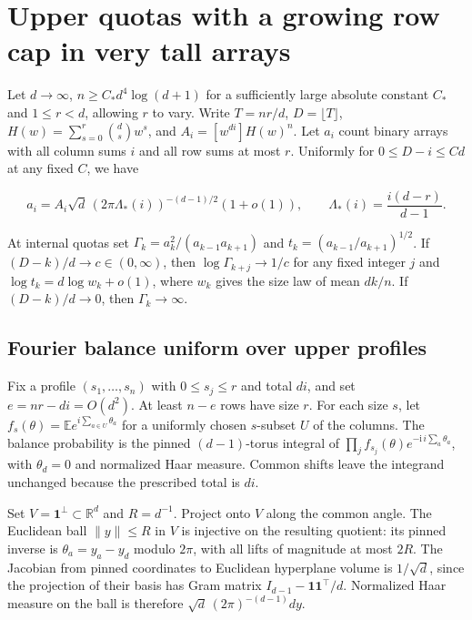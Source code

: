 \section{Upper quotas with a growing row cap in very tall arrays}\label{sec:upper-quota}

Let $d\to\infty$, $n\ge C_*d^4\log(d+1)$ for a sufficiently large absolute constant $C_*$ and $1\le r<d$, allowing $r$ to vary. Write $T=nr/d$, $D=\lfloor T\rfloor$, $H(w)=\sum_{s=0}^r\binom ds w^s$, and $A_i=[w^{di}]H(w)^n$. Let $a_i$ count binary arrays with all column sums $i$ and all row sums at most $r$. Uniformly for $0\le D-i\le Cd$ at any fixed $C$, we have

\begin{equation*}
a_i=A_i\sqrt d\,(2\pi\Lambda_*(i))^{-(d-1)/2}(1+o(1)),
\qquad
\Lambda_*(i)=\frac{i(d-r)}{d-1}.
\end{equation*}

At internal quotas set $\Gamma_k=a_k^2/(a_{k-1}a_{k+1})$ and $t_k=(a_{k-1}/a_{k+1})^{1/2}$. If $(D-k)/d\to c\in(0,\infty)$, then $\log\Gamma_{k+j}\to1/c$ for any fixed integer $j$ and $\log t_k=d\log w_k+o(1)$, where $w_k$ gives the size law of mean $dk/n$. If $(D-k)/d\to0$, then $\Gamma_k\to\infty$.

\subsection{Fourier balance uniform over upper profiles}

Fix a profile $(s_1,\ldots,s_n)$ with $0\le s_j\le r$ and total $di$, and set $e=nr-di=O(d^2)$. At least $n-e$ rows have size $r$. For each size $s$, let $f_s(\theta)=\mathbb E e^{i\sum_{a\in U}\theta_a}$ for a uniformly chosen $s$-subset $U$ of the columns. The balance probability is the pinned $(d-1)$-torus integral of $\prod_jf_{s_j}(\theta)e^{-\mathrm{i}\,i\sum_a\theta_a}$, with $\theta_d=0$ and normalized Haar measure. Common shifts leave the integrand unchanged because the prescribed total is $di$.

Set $V=\mathbf1^\perp\subset\mathbb R^d$ and $R=d^{-1}$. Project onto $V$ along the common angle. The Euclidean ball $\|y\|\le R$ in $V$ is injective on the resulting quotient: its pinned inverse is $\theta_a=y_a-y_d$ modulo $2\pi$, with all lifts of magnitude at most $2R$. The Jacobian from pinned coordinates to Euclidean hyperplane volume is $1/\sqrt d$, since the projection of their basis has Gram matrix $I_{d-1}-\mathbf1\mathbf1^\top/d$. Normalized Haar measure on the ball is therefore $\sqrt d\,(2\pi)^{-(d-1)}dy$.

